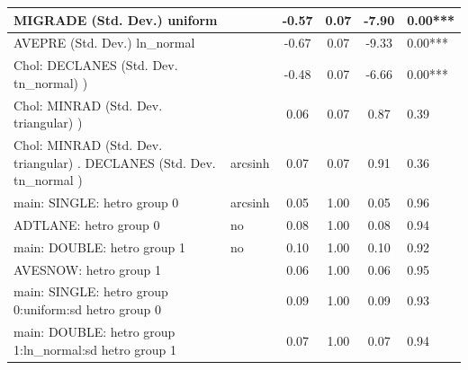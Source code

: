 \begin{table}
\begin{center}
\begin{tabular}{|l|l|c|c|c|l|}
			\hline
			MIGRADE (Std. Dev.) uniform &  & -0.57 & 0.07 & -7.90 & 0.00*** \\
			\hline
			AVEPRE (Std. Dev.) ln_normal &  & -0.67 & 0.07 & -9.33 & 0.00*** \\
			\hline
			 Chol: DECLANES (Std. Dev. tn_normal) ) &  & -0.48 & 0.07 & -6.66 & 0.00*** \\
			\hline
			 Chol: MINRAD (Std. Dev. triangular) ) &  & 0.06 & 0.07 & 0.87 & 0.39 \\
			\hline
			 Chol: MINRAD (Std. Dev. triangular) . DECLANES (Std. Dev.   tn_normal ) & arcsinh & 0.07 & 0.07 & 0.91 & 0.36 \\
			\hline
			main: SINGLE: hetro group 0 & arcsinh & 0.05 & 1.00 & 0.05 & 0.96 \\
			\hline
			ADTLANE: hetro group 0 & no & 0.08 & 1.00 & 0.08 & 0.94 \\
			\hline
			main: DOUBLE: hetro group 1 & no & 0.10 & 1.00 & 0.10 & 0.92 \\
			\hline
			AVESNOW: hetro group 1 &  & 0.06 & 1.00 & 0.06 & 0.95 \\
			\hline
			main: SINGLE: hetro group 0:uniform:sd  hetro group 0 &  & 0.09 & 1.00 & 0.09 & 0.93 \\
			\hline
			main: DOUBLE: hetro group 1:ln_normal:sd  hetro group 1 &  & 0.07 & 1.00 & 0.07 & 0.94 \\
			\hline
		\end{tabular}
	\end{center}
\end{table}